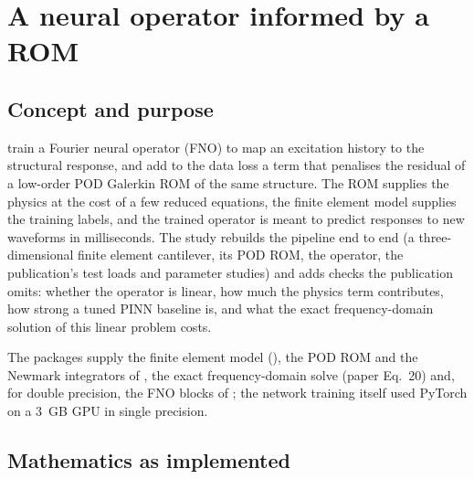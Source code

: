 \section{A neural operator informed by a ROM}\label{sec:vf-frino}

\subsection*{Concept and purpose}

\citet{yang2025frino} train a Fourier neural operator (FNO) to map an excitation history to the structural response, and add to the data loss a term that penalises the residual of a low-order POD Galerkin ROM of the same structure. The ROM supplies the physics at the cost of a few reduced equations, the finite element model supplies the training labels, and the trained operator is meant to predict responses to new waveforms in milliseconds. The study rebuilds the pipeline end to end (a three-dimensional finite element cantilever, its POD ROM, the operator, the publication's test loads and parameter studies) and adds checks the publication omits: whether the operator is linear, how much the physics term contributes, how strong a tuned PINN baseline is, and what the exact frequency-domain solution of this linear problem costs.

The packages supply the finite element model (), the POD ROM and the Newmark integrators of \rom{}, the exact frequency-domain solve (paper Eq.~20) and, for double precision, the FNO blocks of \rom{}; the network training itself used PyTorch on a 3~GB GPU in single precision.

\subsection*{Mathematics as implemented}

